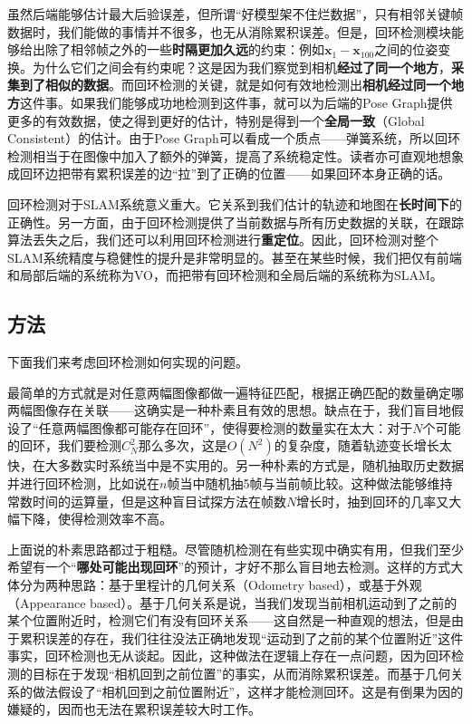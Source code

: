 虽然后端能够估计最大后验误差，但所谓“好模型架不住烂数据”，只有相邻关键帧数据时，我们能做的事情并不很多，也无从消除累积误差。但是，回环检测模块能够给出除了相邻帧之外的一些\textbf{时隔更加久远}的约束：例如$\bm{x}_1-\bm{x}_{100}$之间的位姿变换。为什么它们之间会有约束呢？这是因为我们察觉到相机\textbf{经过了同一个地方}，\textbf{采集到了相似的数据}。而回环检测的关键，就是如何有效地检测出\textbf{相机经过同一个地方}这件事。如果我们能够成功地检测到这件事，就可以为后端的Pose Graph提供更多的有效数据，使之得到更好的估计，特别是得到一个\textbf{全局一致}（Global Consistent）的估计。由于Pose Graph可以看成一个质点——弹簧系统，所以回环检测相当于在图像中加入了额外的弹簧，提高了系统稳定性。读者亦可直观地想象成回环边把带有累积误差的边“拉”到了正确的位置——如果回环本身正确的话。

回环检测对于SLAM系统意义重大。它关系到我们估计的轨迹和地图在\textbf{长时间下}的正确性。另一方面，由于回环检测提供了当前数据与所有历史数据的关联，在跟踪算法丢失之后，我们还可以利用回环检测进行\textbf{重定位}。因此，回环检测对整个SLAM系统精度与稳健性的提升是非常明显的。甚至在某些时候，我们把仅有前端和局部后端的系统称为VO，而把带有回环检测和全局后端的系统称为SLAM。

\subsection{方法}
下面我们来考虑回环检测如何实现的问题。

最简单的方式就是对任意两幅图像都做一遍特征匹配，根据正确匹配的数量确定哪两幅图像存在关联——这确实是一种朴素且有效的思想。缺点在于，我们盲目地假设了“任意两幅图像都可能存在回环”，使得要检测的数量实在太大：对于$N$个可能的回环，我们要检测$C_N^2$那么多次，这是$O(N^2)$的复杂度，随着轨迹变长增长太快，在大多数实时系统当中是不实用的。另一种朴素的方式是，随机抽取历史数据并进行回环检测，比如说在$n$帧当中随机抽5帧与当前帧比较。这种做法能够维持常数时间的运算量，但是这种盲目试探方法在帧数$N$增长时，抽到回环的几率又大幅下降，使得检测效率不高。

上面说的朴素思路都过于粗糙。尽管随机检测在有些实现中确实有用\textsuperscript{\cite{Endres2014}}，但我们至少希望有一个“\textbf{哪处可能出现回环}”的预计，才好不那么盲目地去检测。这样的方式大体分为两种思路：基于里程计的几何关系（Odometry based），或基于外观（Appearance based）。基于几何关系是说，当我们发现当前相机运动到了之前的某个位置附近时，检测它们有没有回环关系\textsuperscript{\cite{Hahnel2003}}——这自然是一种直观的想法，但是由于累积误差的存在，我们往往没法正确地发现“运动到了之前的某个位置附近”这件事实，回环检测也无从谈起。因此，这种做法在逻辑上存在一点问题，因为回环检测的目标在于发现“相机回到之前位置”的事实，从而消除累积误差。而基于几何关系的做法假设了“相机回到之前位置附近”，这样才能检测回环。这是有倒果为因的嫌疑的，因而也无法在累积误差较大时工作\textsuperscript{\cite{Beeson2010}}。

